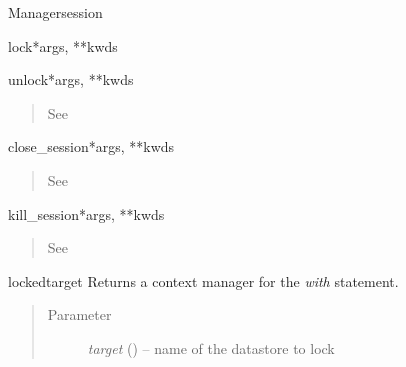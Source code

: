\documentclass[a4paper,10pt,english]{manual}
\begin{document}
\begin{classdesc}{Manager}{session}
\begin{methoddesc}{lock}{*args, **kwds}
\begin{quote}
\begin{description}
\end{description}\end{quote}
\end{methoddesc}

\hypertarget{ncclient.manager.Manager.unlock}{}\begin{methoddesc}{unlock}{*args, **kwds}~\begin{quote}\begin{description}
\item[See]
\hyperlink{ncclient.operations.Unlock.request}{}

\end{description}\end{quote}
\end{methoddesc}

\hypertarget{ncclient.manager.Manager.close_session}{}\begin{methoddesc}{close\_session}{*args, **kwds}~\begin{quote}\begin{description}
\item[See]
\hyperlink{ncclient.operations.CloseSession.request}{}

\end{description}\end{quote}
\end{methoddesc}

\hypertarget{ncclient.manager.Manager.kill_session}{}\begin{methoddesc}{kill\_session}{*args, **kwds}~\begin{quote}\begin{description}
\item[See]
\hyperlink{ncclient.operations.KillSession.request}{}

\end{description}\end{quote}
\end{methoddesc}

\hypertarget{ncclient.manager.Manager.locked}{}\begin{methoddesc}{locked}{target}
Returns a context manager for the \emph{with} statement.
\begin{quote}\begin{description}
\item[Parameter]
\emph{target} (\href{http://docs.python.org/library/string.html\#string}{}) -- name of the datastore to lock


\end{description}
\end{quote}
\end{methoddesc}
\end{classdesc}
\end{document}
